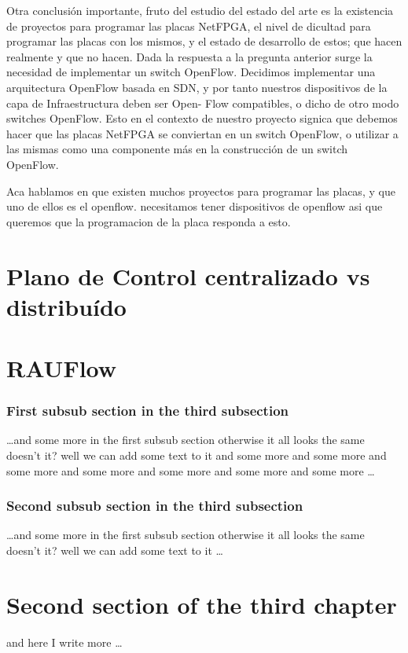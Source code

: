 Otra conclusión importante, fruto del estudio del estado del arte es la existencia de
proyectos para programar las placas NetFPGA, el nivel de dicultad para programar
las placas con los mismos, y el estado de desarrollo de estos; que hacen realmente y
que no hacen.
Dada la respuesta a la pregunta anterior surge la necesidad de implementar un
switch OpenFlow. Decidimos implementar una arquitectura OpenFlow basada en
SDN, y por tanto nuestros dispositivos de la capa de Infraestructura deben ser Open-
Flow compatibles, o dicho de otro modo switches OpenFlow. Esto en el contexto de
nuestro proyecto signica que debemos hacer que las placas NetFPGA se conviertan
en un switch OpenFlow, o utilizar a las mismas como una componente más en la
construcción de un switch OpenFlow.

Aca hablamos en que existen muchos proyectos para programar las placas, y que uno de ellos es el openflow.
necesitamos tener dispositivos de openflow asi que queremos que la programacion de la placa responda a esto.


\section[Alternativas de dise\~nio]{Plano de Control centralizado vs distribu\'ido}

\section[RAUFlow]{RAUFlow}

\subsubsection{First subsub section in the third subsection}
\dots and some more in the first subsub section otherwise it all looks the same
doesn't it? well we can add some text to it and some more and some more and
some more and some more and some more and some more and some more \dots

\subsubsection{Second subsub section in the third subsection}
\dots and some more in the first subsub section otherwise it all looks the same
doesn't it? well we can add some text to it \dots

\section{Second section of the third chapter}
and here I write more \dots

